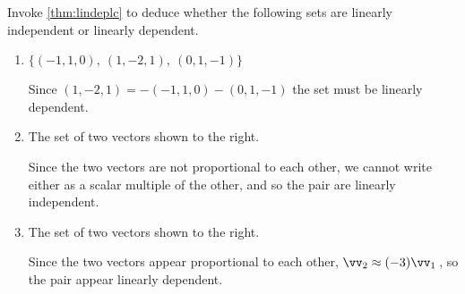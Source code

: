 \begin{example} 
Invoke \cref{thm:lindeplc} to deduce whether the following sets are linearly independent or linearly dependent.
\begin{enumerate}
\item \(\{(-1,1,0),\ (1,-2,1),\ (0,1,-1)\}\)
\begin{solution} 
Since \((1,-2,1)=-(-1,1,0)-(0,1,-1)\) the set must be linearly dependent.
\end{solution}

\item 
\begin{figbox}{}%
The set of two vectors shown to the right.

\begin{solution} 
Since the two vectors are not proportional to each other, we cannot write either as a scalar multiple of the other, and so the pair are linearly independent. 

\end{solution}
\end{figbox}


\item 
\begin{figbox}{}%
The set of two vectors shown to the right.

\begin{solution} 
Since the two vectors appear proportional to each other, \(\vv_2\approx (-3)\vv_1\)\,,  so the pair appear linearly dependent. 


\end{solution}
\end{figbox}
\end{enumerate}
\end{example}
